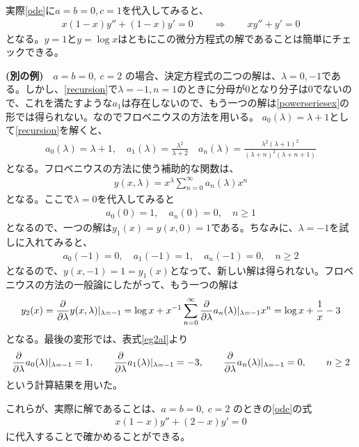 \documentclass[report,paper=a4, fontsize=12pt, line_length=16cm, number_of_lines=33,dvipdfmx]{jlreq}
\numberwithin{equation}{section}
\begin{document}
\begin{enumerate}
実際\eqref{ode}に$a=b=0,c=1$を代入してみると、
\begin{align*}
  x(1-x)y''+(1-x)y'=0\qquad \Rightarrow \qquad
  x y''+y'=0
\end{align*}
となる。$y=1$と$y=\log x$はともにこの微分方程式の解であることは簡単にチェックできる。

\textbf{(別の例)}　$a=b=0,\ c=2$ の場合、決定方程式の二つの解は、$\lambda=0,-1$である。しかし、\eqref{recursion}で$\lambda=-1,n=1$のときに分母が$0$となり分子は$0$でないので、これを満たすような$a_1$は存在しないので、もう一つの解は\eqref{powerseriesex}の形では得られない。なのでフロベニウスの方法を用いる。
$a_0(\lambda)=\lambda+1$として\eqref{recursion}を解くと、
\begin{align}
  a_0(\lambda)=\lambda+1,\quad a_1(\lambda)=\frac{\lambda^2}{\lambda+2}
  \quad a_n(\lambda)=\frac{\lambda^2(\lambda+1)^2}{(\lambda+n)^2(\lambda+n+1)}
  \label{eg2al}\tag{♮}
\end{align}
となる。フロベニウスの方法に使う補助的な関数は、
\begin{align*}
  y(x,\lambda)=x^{\lambda}\sum_{n=0}^{\infty}a_n(\lambda)x^n
\end{align*}
となる。ここで$\lambda=0$を代入してみると
\begin{align*}
  a_0(0)=1,\quad a_n(0)=0,\quad n\ge 1
\end{align*}
となるので、一つの解は$y_1(x)=y(x,0)=1$である。ちなみに、$\lambda=-1$を試しに入れてみると、
\begin{align*}
  a_0(-1)=0,\quad a_1(-1)=1,\quad a_n(-1)=0,\quad n\ge 2
\end{align*}
となるので、$y(x,-1)=1=y_1(x)$となって、新しい解は得られない。フロベニウスの方法の一般論にしたがって、もう一つの解は
\begin{align*}
  y_2(x)=\pdv{\lambda}y(x,\lambda)|_{\lambda=-1}
  =\log x +x^{-1}\sum_{n=0}^{\infty}\pdv{\lambda}a_n(\lambda)|_{\lambda=-1}x^n
  =\log x + \frac{1}{x}-3
\end{align*}
となる。最後の変形では、表式\eqref{eg2al}より
\begin{align*}
  \pdv{\lambda}a_0(\lambda)|_{\lambda=-1}=1,\qquad
  \pdv{\lambda}a_1(\lambda)|_{\lambda=-1}=-3,\qquad
  \pdv{\lambda}a_n(\lambda)|_{\lambda=-1}=0,\qquad n\ge 2
\end{align*}
という計算結果を用いた。

これらが、実際に解であることは、$a=b=0,\ c=2$ のときの\eqref{ode}の式
\begin{align*}
  x(1-x)y''+(2-x)y'=0
\end{align*}
に代入することで確かめることができる。
\end{enumerate}
\end{document}
